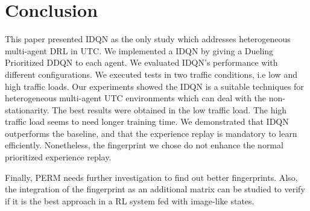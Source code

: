 \documentclass{llncs}
\begin{document}
\section{Conclusion}

This paper presented IDQN as the only study which addresses heterogeneous multi-agent DRL in UTC. We implemented a IDQN by giving a Dueling Prioritized DDQN to each agent. We evaluated IDQN's performance with different configurations. We executed tests in two traffic conditions, i.e low and high traffic loads. Our experiments showed the IDQN is a suitable techniques for heterogeneous multi-agent UTC environments which can deal with the non-stationarity. The best results were obtained in the low traffic load. The high traffic load seems to need longer training time. We demonstrated that IDQN outperforms the baseline, and that the experience replay is mandatory to learn efficiently. Nonetheless, the fingerprint we chose do not enhance the normal prioritized experience replay.

Finally, PERM needs further investigation to find out better fingerprints. Also, the integration of the fingerprint as an additional matrix can be studied to verify if it is the best approach in a RL system fed with image-like states.


 
\end{document}
